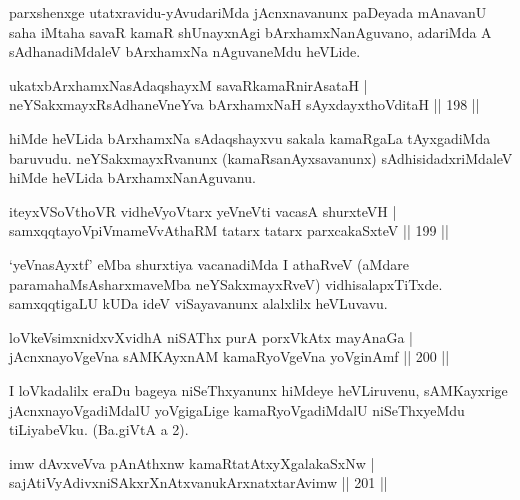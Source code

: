 \begin{artha}
parxshenxge utatxravidu-yAvudariMda jAcnxnavanunx paDeyada mAnavanU saha iMtaha savaR kamaR shUnayxnAgi bArxhamxNanAguvano, adariMda A sAdhanadiMdaleV bArxhamxNa nAguvaneMdu heVLide.
\end{artha}

\begin{shl}
ukatxbArxhamxNasAdaqshayxM savaRkamaRnirAsataH |\\
neYSakxmayxRsAdhaneVneYva bArxhamxNaH sAyxdayxthoVditaH \hfill || 198 ||
\end{shl}

\begin{artha}
hiMde heVLida bArxhamxNa sAdaqshayxvu sakala kamaRgaLa tAyxgadiMda baruvudu. neYSakxmayxRvanunx (kamaRsanAyxsavanunx) sAdhisidadxriMdaleV hiMde heVLida bArxhamxNanAguvanu.
\end{artha}

\begin{shl}
iteyxVSoV\s thoVR vidheVyoV\s tarx yeVneVti vacasA shurxteVH |\\
samxqqtayoV\s piVmameVvAthaRM tatarx tatarx parxcakaSxteV \hfill || 199 ||
\end{shl}

\begin{artha}
`yeVnasAyxtf' eMba shurxtiya vacanadiMda I athaRveV (aMdare paramahaMsAsharxmaveMba neYSakxmayxRveV) vidhisalapxTiTxde. samxqqtigaLU kUDa ideV viSayavanunx alalxlilx heVLuvavu.
\end{artha}%


\begin{shl}
loVkeV\s simxnidxvXvidhA niSAThx purA porxVkAtx mayA\s naGa |\\
jAcnxnayoVgeVna sAMKAyxnAM kamaRyoVgeVna yoVginAmf \hfill || 200 ||
\end{shl}

\begin{artha}
I loVkadalilx eraDu bageya niSeThxyanunx hiMdeye heVLiruvenu, sAMKayxrige jAcnxnayoVgadiMdalU yoVgigaLige kamaRyoVgadiMdalU niSeThxyeMdu tiLiyabeVku. (Ba.giVtA a 2).
\end{artha}


\begin{shl}
imw dAvxveVva pAnAthxnw kamaRtatAtxyXgalakaSxNw |\\
\footnotemark[1]{}sajAtiVyAdivxniSAkxrXnAtxvanukArxnatxtarAvimw \hfill || 201 ||
\end{shl}

